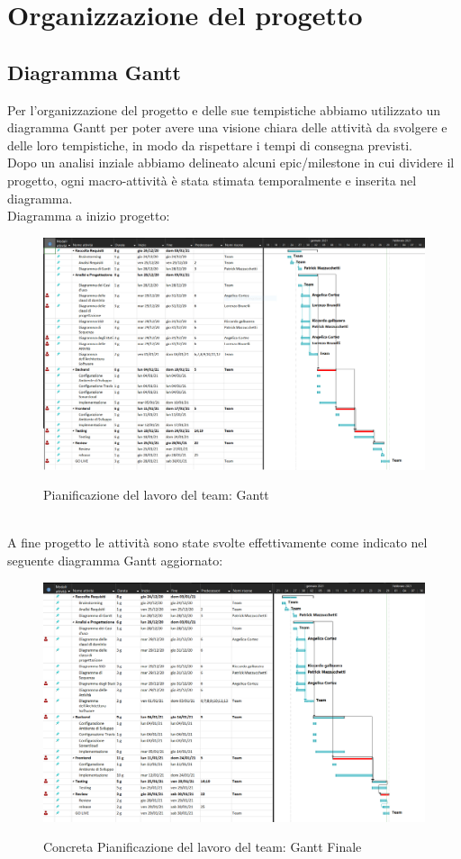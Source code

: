 \documentclass{article}
\begin{document}
\section{Organizzazione del progetto}
\subsection{Diagramma Gantt}
Per l’organizzazione del progetto e delle sue tempistiche abbiamo utilizzato un diagramma Gantt per poter avere una visione chiara delle attività da svolgere e delle loro tempistiche, in modo da rispettare i tempi di consegna previsti.\\
Dopo un analisi inziale abbiamo delineato alcuni epic/milestone in cui dividere il progetto, ogni macro-attività è stata stimata temporalmente e inserita nel diagramma.\\
Diagramma a inizio progetto:\\
\begin{figure}[h!]
\centering
\includegraphics[scale=0.4]{screen1.PNG}
\label{fig:Gantt iniziale}
\caption{Pianificazione del lavoro del team: Gantt}
\end{figure}
\\
A fine progetto le attività sono state svolte effettivamente come indicato nel seguente diagramma Gantt aggiornato:
\begin{figure}[h!]
\centering
\includegraphics[scale=0.4]{screen1Finale.PNG}
\label{fig:Gantt Finale}
\caption{Concreta Pianificazione del lavoro del team: Gantt Finale}
\end{figure}
\end{document}
